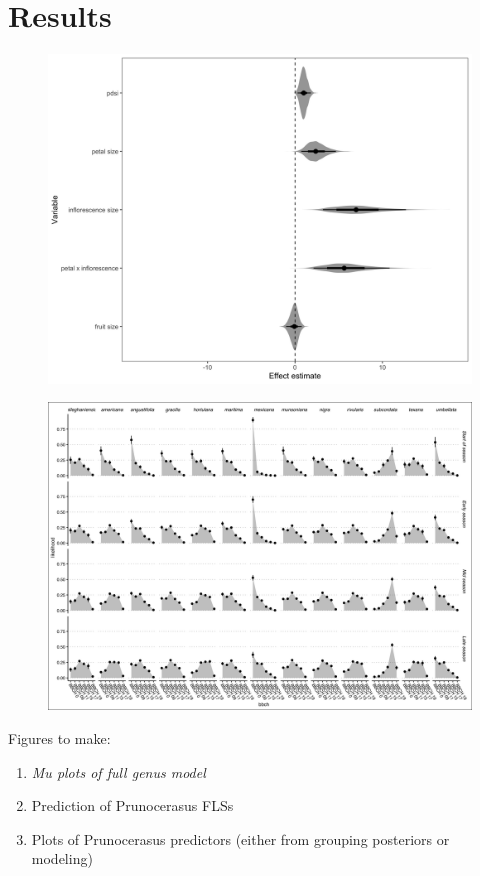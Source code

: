 \documentclass{article}\usepackage[]{graphicx}\usepackage[]{color}
\begin{document}
\section*{Results}
\begin{figure}[h!]
    \centering
 \includegraphics[width=\textwidth]{..//..//Plots/fullprunus_mus.jpeg}
    \caption{}
    \label{fig:cherries}
\end{figure}

\begin{figure}[h!]
    \centering
 \includegraphics[width=\textwidth]{..//..//Plots/ord_quants.jpeg}
    \caption{}
    \label{fig:plums}
\end{figure}

Figures to make:
\begin{enumerate}
\item \textit{Mu plots of full genus model}
\item Prediction of Prunocerasus FLSs
\item Plots of Prunocerasus predictors (either from grouping posteriors or modeling)
\end{enumerate}
\end{document}
